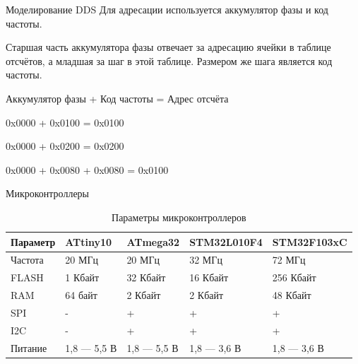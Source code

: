 \documentclass[10pt]{beamer}
\begin{document}
\begin{frame}[containsverbatim]{Моделирование DDS}
	Для адресации используется аккумулятор фазы и код частоты. 
	
	Старшая часть аккумулятора фазы отвечает за адресацию ячейки в таблице отсчётов, а младшая за шаг в этой таблице. Размером же шага является код частоты.

	Аккумулятор фазы + Код частоты = Адрес отсчёта 
	
	0x0000 + 0x0100 = 0x0100

	0x0000 + 0x0200 = 0x0200
	
	0x0000 + 0x0080 + 0x0080 = 0x0100
		
\end{frame}

\begin{frame}{Микроконтроллеры}
\begin{small}
\begin{table}[H]
\caption{Параметры микроконтроллеров}
\begin{tabular}{|p{1.5 cm}|p{1.9 cm}|p{1.9 cm}|p{1.9 cm}|p{1.9 cm}|}
\hline
        Параметр & ATtiny10 & ATmega32 & STM32L010F4 & STM32F103xC \\ \hline
        Частота & 20 МГц & 20 МГц & 32 МГц & 72 МГц \\ \hline
        FLASH & 1 Кбайт & 32 Кбайт & 16 Кбайт & 256 Кбайт \\ \hline
        RAM & 64 байт & 2 Кбайт & 2 Кбайт & 48 Кбайт \\ \hline
        SPI & - & + & + & + \\ \hline
        I2C & - & +	 & + & + \\ \hline
        Питание & 1,8 --- 5,5 В & 1,8 --- 5,5 В & 1,8 --- 3,6 В & 1,8 --- 3,6 В \\ \hline
\end{tabular}
\end{table}
\end{small}
\end{frame}
\end{document}
